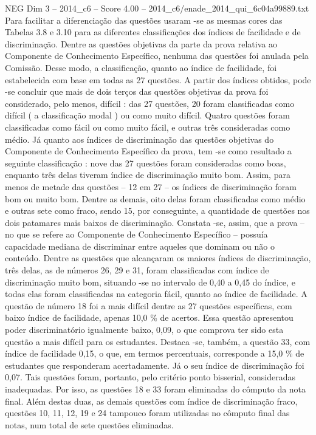 \begin{textsample}{NEG Dim 3 – 2014\_c6 – Score 4.00 – 2014\_c6/enade\_2014\_qui\_6c04a99889.txt}
Para facilitar a diferenciação das questões usaram -se as mesmas cores das Tabelas 3.8 e 3.10 para as diferentes classificações dos índices de facilidade e de discriminação.
Dentre as questões objetivas da parte da prova relativa ao Componente de Conhecimento Específico, nenhuma das questões foi anulada pela Comissão.
Desse modo, a classificação, quanto ao índice de facilidade, foi estabelecida com base em todas as 27 questões.
A partir dos índices obtidos, pode -se concluir que mais de dois terços das questões objetivas da prova foi considerado, pelo menos, difícil : das 27 questões, 20 foram classificadas como difícil ( a classificação modal ) ou como muito difícil.
Quatro questões foram classificadas como fácil ou como muito fácil, e outras três consideradas como médio.
Já quanto aos índices de discriminação das questões objetivas do Componente de Conhecimento Específico da prova, tem -se como resultado a seguinte classificação : nove das 27 questões foram consideradas como boas, enquanto três delas tiveram índice de discriminação muito bom.
Assim, para menos de metade das questões – 12 em 27 – os índices de discriminação foram bom ou muito bom.
Dentre as demais, oito delas foram classificadas como médio e outras sete como fraco, sendo 15, por conseguinte, a quantidade de questões nos dois patamares mais baixos de discriminação.
Constata -se, assim, que a prova – no que se refere ao Componente de Conhecimento Específico – possuía capacidade mediana de discriminar entre aqueles que dominam ou não o conteúdo.
Dentre as questões que alcançaram os maiores índices de discriminação, três delas, as de números 26, 29 e 31, foram classificadas com índice de discriminação muito bom, situando -se no intervalo de 0,40 a 0,45 do índice, e todas elas foram classificadas na categoria fácil, quanto ao índice de facilidade.
A questão de número 18 foi a mais difícil dentre as 27 questões específicas, com baixo índice de facilidade, apenas 10,0 \% de acertos.
Essa questão apresentou poder discriminatório igualmente baixo, 0,09, o que comprova ter sido esta questão a mais difícil para os estudantes.
Destaca -se, também, a questão 33, com índice de facilidade 0,15, o que, em termos percentuais, corresponde a 15,0 \% de estudantes que responderam acertadamente.
Já o seu índice de discriminação foi 0,07.
Tais questões foram, portanto, pelo critério ponto bisserial, consideradas inadequadas.
Por isso, as questões 18 e 33 foram eliminadas do cômputo da nota final.
Além destas duas, as demais questões com índice de discriminação fraco, questões 10, 11, 12, 19 e 24 tampouco foram utilizadas no cômputo final das notas, num total de sete questões eliminadas.

\end{textsample}
